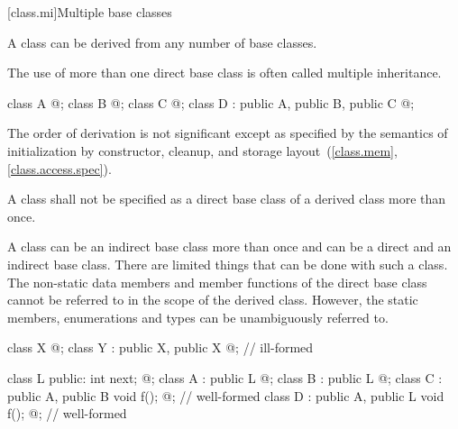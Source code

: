 [class.mi]{Multiple base classes}
%
%

\pnum
A class can be derived from any number of base classes.
\begin{note}
The use of more than one direct base class is often called multiple inheritance.
\end{note}
\begin{example}
\begin{codeblock}
class A { @\commentellip@ };
class B { @\commentellip@ };
class C { @\commentellip@ };
class D : public A, public B, public C { @\commentellip@ };
\end{codeblock}
\end{example}

\pnum
{}%
%
\begin{note}
The order of derivation is not significant except as specified by the
semantics of initialization by constructor,
cleanup, and storage
layout~(\ref{class.mem}, \ref{class.access.spec}).
\end{note}

\pnum
A class shall not be specified as a direct base class of a derived class
more than once.
\begin{note}
A class can be an indirect base class more than once and can be a direct
and an indirect base class. There are limited things that can be done
with such a class. The non-static data members and member functions of
the direct base class cannot be referred to in the scope of the derived
class. However, the static members, enumerations and types can be
unambiguously referred to.
\end{note}
\begin{example}
\begin{codeblock}
class X { @\commentellip@ };
class Y : public X, public X { @\commentellip@ };             // ill-formed

\end{codeblock}
\begin{codeblock}
class L { public: int next;  @\commentellip@ };
class A : public L { @\commentellip@ };
class B : public L { @\commentellip@ };
class C : public A, public B { void f(); @\commentellip@ };   // well-formed
class D : public A, public L { void f(); @\commentellip@ };   // well-formed
\end{codeblock}
\end{example}

